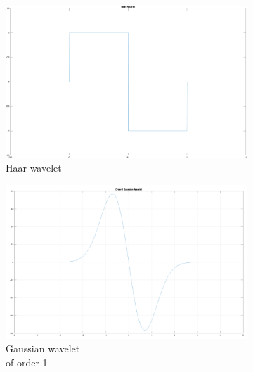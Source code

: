 \begin{enumerate}[label=\textbf{\arabic*})]
    \begin{figure}
        \centering
        \begin{subfigure}{.4\textwidth}
          \centering
          \includegraphics[width=\linewidth]{Figures/haar.png}
          \caption{Haar wavelet}
          \label{Haar}
        \end{subfigure}
        \hfill
        \begin{subfigure}{.4\textwidth}
            \centering
            \includegraphics[width=\linewidth]{Figures/order1gaussian.png}
            \caption{Gaussian wavelet \\of order 1}
            \label{order1}
        \end{subfigure}
        \hfill
        \begin{subfigure}{.4\textwidth}
          \centering

\end{subfigure}
\end{figure}
\end{enumerate}
